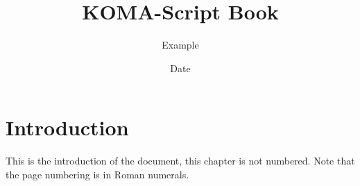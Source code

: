 \documentclass[
    fontsize=10pt,
    twoside=semi,
    usegeometry,
    autoenlargeheadfoot=false,
    toc=bibliography,
    open=any,
]{scrbook}
\title{KOMA-Script Book}
\subtitle{Example}
\date{Date}
\begin{document}
    \frontmatter

    \maketitle
    \tableofcontents
    \chapter{Introduction}
    This is the introduction of the document, this chapter is not numbered.
    Note that the page numbering is in Roman numerals.

    \mainmatter
    

    \backmatter
    \printbibliography
\end{document}
